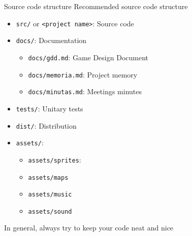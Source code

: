 \documentclass[10pt,compress]{beamer} %
\begin{document}
\begin{frame}{Source code structure}
	Recommended source code structure
	\begin{itemize}
	\item \texttt{src/} or \texttt{<project name>}: Source code
	\item \texttt{docs/}: Documentation
		\begin{itemize}
		\item \texttt{docs/gdd.md}: Game Design Document
		\item \texttt{docs/memoria.md}: Project memory
		\item \texttt{docs/minutas.md}: Meetings minutes
		\end{itemize}
	\item \texttt{tests/}: Unitary tests
	\item \texttt{dist/}: Distribution
	\item \texttt{assets/}:
		\begin{itemize}
		\item \texttt{assets/sprites}:
		\item \texttt{assets/maps}
		\item \texttt{assets/music}
		\item \texttt{assets/sound}
		\end{itemize}
	\end{itemize}
   In general, always try to keep your code neat and nice
\end{frame}

\end{document}
